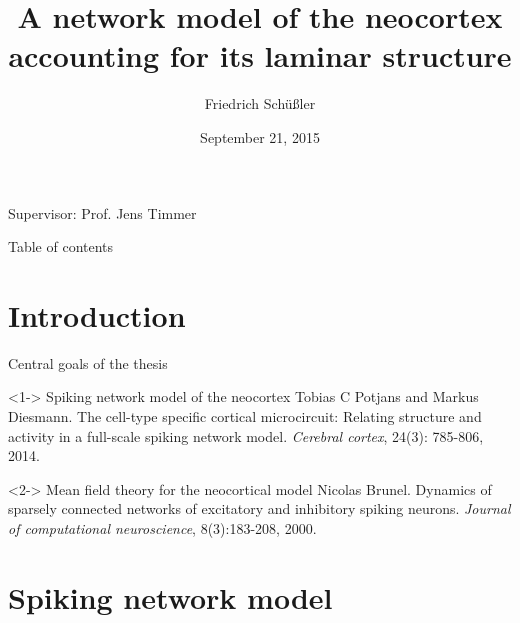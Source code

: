 \documentclass[xcolor=x11names,compress]{beamer}
\renewcommand{\(}{\begin{columns}}
\renewcommand{\)}{\end{columns}}
\newcommand{\<}[1]{\begin{column}{#1}}
\renewcommand{\>}{\end{column}}
\begin{document}
\begin{frame}{}
\title[Neocortex]{A network model of the neocortex accounting for its laminar structure}
\author{
Friedrich Schüßler}
\date{\normalsize September 21, 2015}
\titlepage

\centering 
Supervisor: Prof. Jens Timmer
\end{frame}

\begin{frame}{Table of contents}
    \tableofcontents
\end{frame}


\section{Introduction}
\label{sec:introduction}

\begin{frame}[J]{Central goals of the thesis}
    \begin{block}<1->
        {Spiking network model of the neocortex}
        \footnotesize
        Tobias C Potjans and Markus Diesmann. 
        The cell-type specific cortical microcircuit:
        Relating structure and activity in a full-scale spiking network model.
        \textit{Cerebral cortex}, 24(3): 785-806, 2014.
    \end{block}
    \vfill
    \begin{block}<2->
        {Mean field theory for the neocortical model}
        \footnotesize
        Nicolas Brunel.
        Dynamics of sparsely connected networks of excitatory and inhibitory spiking 
        neurons. 
        \textit{Journal of computational neuroscience}, 8(3):183-208, 2000.
    \end{block}
\end{frame}

\section{Spiking network model}
\label{sec:spiking_network_model}
\end{document}
